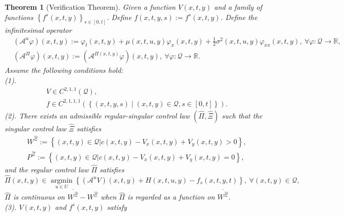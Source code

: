 \documentclass[10pt,a4paper]{amsart}
\newtheorem{theorem}{Theorem}
\begin{document}
\begin{theorem}[Verification Theorem]\label{verificationthm}
Given a function $V(x,t,y)$ and a family of functions $\left\{f^{s}(x,t,y)\right\}_{s\in[0,t]}$. Define $f(x,t,y,s):=f^{s}(x,t,y)$. Define the infinitesimal operator
\begin{equation}
\begin{aligned}
&\left(\mathcal{A}^{u}\varphi\right)(x,t,y):=\varphi_{t}(x,t,y)+\mu(x,t,u,y)\varphi_{x}(x,t,y)+\frac{1}{2}\sigma^{2}(x,t,u,y)\varphi_{xx}(x,t,y),\ \forall\varphi:\mathcal{Q}\rightarrow\mathbb{R},\\
&\left(\mathcal{A}^{\Pi}\varphi\right)(x,t,y):=\left(\mathcal{A}^{\Pi(x,t,y)}\varphi\right)(x,t,y),\ \forall\varphi:\mathcal{Q}\rightarrow\mathbb{R}.
\end{aligned}\nonumber
\end{equation} 
Assume the following conditions hold:\\
(1).
\begin{equation}
\begin{aligned}
& V \in C^{2,1,1}\left(\mathcal{Q}\right), \\
& f \in C^{2,1,1,1}\left(\left\{(x,t,y,s)\mid (x,t,y)\in\mathcal{Q}, s\in [0,t]\right\}\right).
\end{aligned}\nonumber
\end{equation}
(2). There exists an admissible regular-singular control law $\left(\hat{\Pi},\hat{\Xi}\right)$ such that the singular control law $\hat{\Xi}$ satisfies
\begin{equation}
\begin{aligned}
&W^{\hat{\Xi}}:=\left\{(x,t,y)\in\mathcal{Q}|c(x,t,y)-V_{x}(x,t,y)+V_{y}(x,t,y)>0\right\},\\
&P^{\hat{\Xi}}:=\left\{(x,t,y)\in\mathcal{Q}|c(x,t,y)-V_{x}(x,t,y)+V_{y}(x,t,y)=0\right\},
\end{aligned}\nonumber
\end{equation}
and the regular control law $\hat{\Pi}$ satisfies
\begin{equation}
\hat{\Pi}(x,t,y)\in\mathop{\mathrm{argmin}}\limits_{u\in U}\left\{\left(\mathcal{A}^{u}V\right)(x,t,y)+H(x,t,u,y)-f_s(x,t,y,t)\right\},\ \forall (x,t,y)\in\mathcal{Q},
\nonumber
\end{equation}
$\hat{\Pi}$ is continuous on $\overline{W^{\hat{\Xi}}}-W^{\hat{\Xi}}$ when $\hat{\Pi}$ is regarded as a function on $\overline{W^{\hat{\Xi}}}$. \\
(3). $V(x,t,y)$ and $f^{s}(x,t,y)$ satisfy


\end{theorem}
\end{document}
